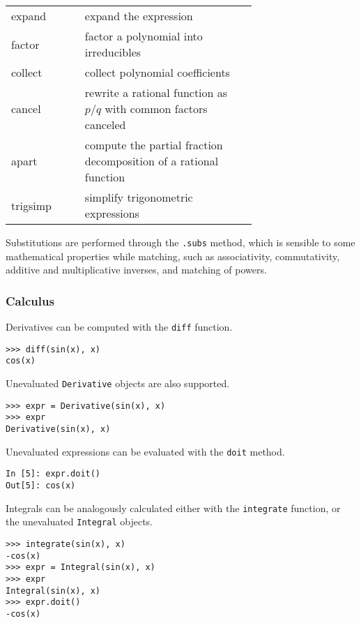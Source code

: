 \label{simplify-table}
\begin{tabular}{l|p{0.7\linewidth}}
expand & expand the expression \\
factor & factor a polynomial into irreducibles \\
collect & collect polynomial coefficients \\
cancel & rewrite a rational function as $p/q$ with common factors canceled \\
apart & compute the partial fraction decomposition of a rational function \\
trigsimp & simplify trigonometric expressions~\cite{fu2006automated} \\
\end{tabular}

Substitutions are performed through the \texttt{.subs} method, which is
sensible to some mathematical properties while matching, such as
associativity, commutativity, additive and multiplicative inverses, and
matching of powers.


\subsubsection{Calculus}


Derivatives can be computed with the \verb|diff| function.

\begin{verbatim}
>>> diff(sin(x), x)
cos(x)
\end{verbatim}

Unevaluated \verb|Derivative| objects are also supported.

\begin{verbatim}
>>> expr = Derivative(sin(x), x)
>>> expr
Derivative(sin(x), x)
\end{verbatim}

Unevaluated expressions can be evaluated with the \verb|doit| method.

\begin{verbatim}
In [5]: expr.doit()
Out[5]: cos(x)
\end{verbatim}

Integrals can be analogously calculated either with the \verb|integrate|
function, or the unevaluated \verb|Integral| objects.
\begin{verbatim}
>>> integrate(sin(x), x)
-cos(x)
>>> expr = Integral(sin(x), x)
>>> expr
Integral(sin(x), x)
>>> expr.doit()
-cos(x)
\end{verbatim}

